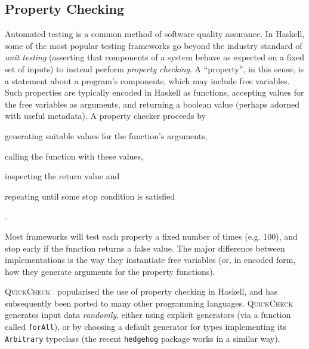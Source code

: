 \subsection{Property Checking}

Automated testing is a common method of software quality assurance. In Haskell,
some of the most popular testing frameworks go beyond the industry standard of
\emph{unit testing} (asserting that components of a system behave as expected on
a fixed set of inputs) to instead perform \emph{property checking}. A
``property'', in this sense, is a statement about a program's components, which
may include free variables. Such properties are typically encoded in Haskell as
functions, accepting values for the free variables as arguments, and returning a
boolean value (perhaps adorned with useful metadata). A property checker
proceeds by
\begin{enumerate*}
\item generating suitable values for the function's arguments,
\item calling the function with these values,
\item inspecting the return value and
\item repeating until some stop condition is satisfied
\end{enumerate*}.

Most frameworks will test each property a fixed number of times (e.g. 100), and
stop early if the function returns a false value. The major difference between
implementations is the way they instantiate free variables (or, in encoded form,
how they generate arguments for the property functions).

\textsc{QuickCheck}~\cite{claessen2011quickcheck} popularised the use of
property checking in Haskell, and has subsequently been ported to many other
programming languages. \textsc{QuickCheck} generates input data \emph{randomly},
either using explicit generators (via a function called \texttt{forAll}), or by
choosing a default generator for types implementing its \texttt{Arbitrary}
typeclass (the recent \texttt{hedgehog} package works in a similar way).

